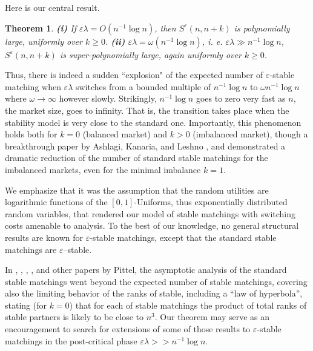 \documentclass[11pt]{amsart}
\newtheorem{theorem}{Theorem}[section]																\newtheorem{proposition}[theorem]{Proposition}
\def\eps{\varepsilon}
\def\la{\lambda}
\theoremstyle{remark}
\numberwithin{equation}{section}
\begin{document}
Here is our central result.
\begin{theorem}\label{thm1} {\bf(i)\/} If $\eps\la=O(n^{-1}\log n)$, then $S^{\eps}(n,n+k)$ is polynomially large, uniformly over $k\ge 0$. {\bf(ii)\/} $\eps\la=\omega(n^{-1}\log n)$, i. e. $\eps\la\gg n^{-1}\log n$, $S^{\eps}(n,n+k)$ is super-polynomially large, again uniformly over $k\ge 0$. 
\end{theorem}
Thus, there is indeed a sudden ``explosion" of the expected number of $\eps$-stable matching when $\eps\la$ switches from a bounded multiple of $n^{-1}\log n$ to $\omega n^{-1}\log n$ where $\omega\to\infty$ however slowly. Strikingly, 
$n^{-1}\log n$ goes to zero very fast as $n$, the market size, goes to infinity. That is, the transition takes place when the stability model is very close to the standard one. Importantly, this phenomenon holds both for $k=0$ (balanced market) and $k>0$ (imbalanced market), though a breakthrough paper by Ashlagi, Kanaria, and Leshno \cite{AKL}, and \cite{Pit2} demonstrated a dramatic reduction of the number of standard stable matchings for the imbalanced markets, even for the minimal imbalance $k=1$.

We emphasize that it was the assumption that the random utilities are logarithmic functions of the $[0,1]$-Uniforms, thus exponentially distributed random variables, that rendered our model of stable matchings with switching costs  amenable to analysis. To the best of our knowledge, no general structural results are known for $\eps$-stable matchings, except that the standard stable matchings are $\eps$--stable. 

In \cite{Pit1}, \cite{Pit1.5}, \cite{Pit2}, \cite{Pit3}, and other papers by Pittel, the asymptotic analysis of the standard stable matchings went beyond 
the expected number of stable matchings, covering also the limiting behavior of the ranks of stable, including a ``law of hyperbola'', stating (for $k=0$) that for each of stable matchings the product of total ranks of stable partners
is likely to be close to $n^3$. Our theorem may serve as an encouragement to search for extensions of some of those results to $\eps$-stable matchings in the post-critical phase $\eps\la>\!>n^{-1}\log n$. 
\end{document}
